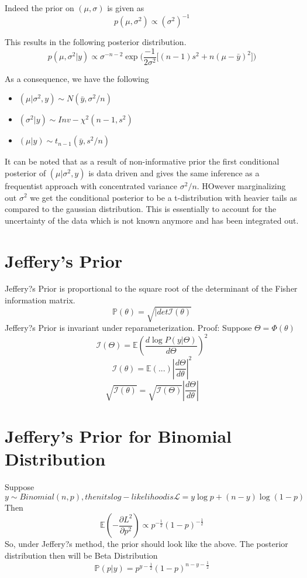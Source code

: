 \documentclass[twoside]{article}
\begin{document}
Indeed the prior on $(\mu, \sigma)$ is given as
\[p(\mu, \sigma^2) \propto (\sigma^2)^{-1} \]

This results in the following posterior distribution. 
\[p(\mu,\sigma^2|y) \propto \sigma^{-n-2}\exp\Bigg(\frac{-1}{2\sigma^2}\Big[(n-1)s^2 + n(\mu - \bar{y})^2\Big]\Bigg)\]

As a consequence, we have the following
\begin{itemize}
	\item $(\mu|\sigma^2,y) \sim N(\bar{y},\sigma^2/n)$
	\item $(\sigma^2|y) \sim Inv-\chi^2(n-1,s^2)$
	\item $(\mu|y) \sim t_{n-1}(\bar{y}, s^2/n)$
\end{itemize}
It can be noted that as a result of non-informative prior the first conditional posterior of $(\mu|\sigma^2,y)$ is data driven and gives the same inference as a frequentist approach with concentrated variance $\sigma^2/n$. HOwever marginalizing out $\sigma^2$ we get the conditional posterior to be a t-distribution with heavier tails as compared to the gaussian distribution. This is essentially to account for the uncertainty of the data which is not known anymore and has been integrated out.

\section{Jeffery's Prior}
Jeffery?s Prior is proportional to the square root of the determinant of the Fisher information matrix.
\[\mathbb P(\theta) = \sqrt{|det \mathcal I(\theta)}\]
Jeffery?s Prior is invariant under reparameterization.
Proof: 
Suppose $\Theta = \Phi (\theta)$
\[\mathcal I(\Theta) = \mathbb E(\frac{d\log{P(y|\Theta)}}{d\Theta})^2\]
\[\mathcal I(\theta) = \mathbb E(...)|\frac{d\Theta}{d\theta}|^2\]
\[\sqrt{\mathcal I(\theta)} = \sqrt{\mathcal I(\Theta)}|\frac{d\Theta}{d\theta}|\]

\section{ Jeffery's Prior for Binomial Distribution}
Suppose $y \sim Binomial(n,p), then its log-likelihood is \mathcal L = y\log{p} + (n-y)\log{(1-p)}$
Then
\[\mathbb E(-\frac{\partial L^2}{\partial p^2}) \propto p^{-\frac{1}{2}}(1-p)^{-\frac{1}{2}}\]
So, under Jeffery?s method, the prior should look like the above.
The posterior distribution then will be Beta Distribution
\[\mathbb P(p|y) = p^{y - \frac{1}{2}}(1-p)^{n-y-\frac{1}{2}}\]
\end{document}
